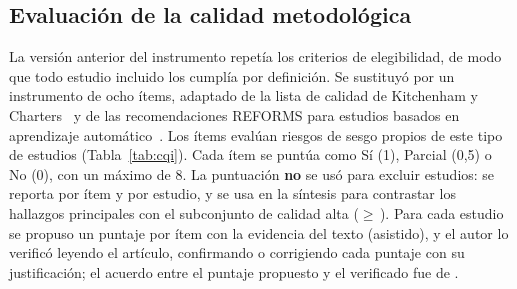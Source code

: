 \documentclass[12pt, a4paper]{article}
\begin{document}
\subsection{Evaluaci\'{o}n de la calidad metodol\'{o}gica}

La versi\'{o}n anterior del instrumento repet\'{i}a los criterios de elegibilidad, de modo que todo estudio incluido los cumpl\'{i}a por definici\'{o}n. Se sustituy\'{o} por un instrumento de ocho \'{i}tems, adaptado de la lista de calidad de Kitchenham y Charters~\cite{Kitchenham2007} y de las recomendaciones REFORMS para estudios basados en aprendizaje autom\'{a}tico~\cite{kapoor2024reforms}. Los \'{i}tems eval\'{u}an riesgos de sesgo propios de este tipo de estudios (Tabla~\ref{tab:cqi}). Cada \'{i}tem se punt\'{u}a como S\'{i} (1), Parcial (0,5) o No (0), con un m\'{a}ximo de 8. La puntuaci\'{o}n \textbf{no} se us\'{o} para excluir estudios: se reporta por \'{i}tem y por estudio, y se usa en la s\'{i}ntesis para contrastar los hallazgos principales con el subconjunto de calidad alta ($\geq$\,\QAumbralAlta). Para cada estudio se propuso un puntaje por \'{i}tem con la evidencia del texto (asistido), y el autor lo verific\'{o} leyendo el art\'{i}culo, confirmando o corrigiendo cada puntaje con su justificaci\'{o}n; el acuerdo entre el puntaje propuesto y el verificado fue de \AcuerdoCalidad.
\end{document}
